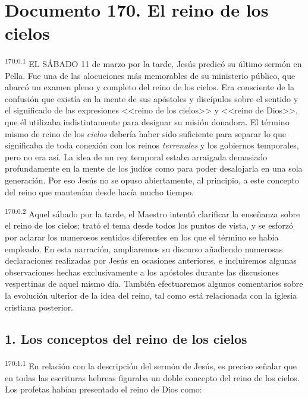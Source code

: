\chapter{Documento 170. El reino de los cielos}
\par 
\textsuperscript{170:0.1} EL SÁBADO 11 de marzo por la tarde, Jesús predicó su último sermón en Pella. Fue una de las alocuciones más memorables de su ministerio público, que abarcó un examen pleno y completo del reino de los cielos. Era consciente de la confusión que existía en la mente de sus apóstoles y discípulos sobre el sentido y el significado de las expresiones <<reino de los cielos>> y <<reino de Dios>>, que él utilizaba indistintamente para designar su misión donadora. El término mismo de reino de los \textit{cielos} debería haber sido suficiente para separar lo que significaba de toda conexión con los reinos \textit{terrenales} y los gobiernos temporales, pero no era así. La idea de un rey temporal estaba arraigada demasiado profundamente en la mente de los judíos como para poder desalojarla en una sola generación. Por eso Jesús no se opuso abiertamente, al principio, a este concepto del reino que mantenían desde hacía mucho tiempo.

\par 
\textsuperscript{170:0.2} Aquel sábado por la tarde, el Maestro intentó clarificar la enseñanza sobre el reino de los cielos; trató el tema desde todos los puntos de vista, y se esforzó por aclarar los numerosos sentidos diferentes en los que el término se había empleado. En esta narración, ampliaremos su discurso añadiendo numerosas declaraciones realizadas por Jesús en ocasiones anteriores, e incluiremos algunas observaciones hechas exclusivamente a los apóstoles durante las discusiones vespertinas de aquel mismo día. También efectuaremos algunos comentarios sobre la evolución ulterior de la idea del reino, tal como está relacionada con la iglesia cristiana posterior.

\section*{1. Los conceptos del reino de los cielos}
\par 
\textsuperscript{170:1.1} En relación con la descripción del sermón de Jesús, es preciso señalar que en todas las escrituras hebreas figuraba un doble concepto del reino de los cielos. Los profetas habían presentado el reino de Dios como:

